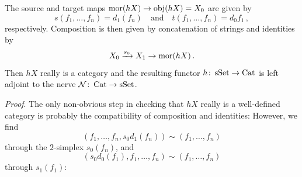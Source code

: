         The source and target maps $\operatorname{mor}(hX) \to \operatorname{obj}(hX) = X_0$ are given by
        \begin{equation*}
            s(f_1, \ldots, f_n) = d_1(f_n) \quad \text{and} \quad t(f_1, \ldots, f_n) = d_0 f_1 \,,
        \end{equation*}
        respectively. Composition is then given by concatenation of strings and identities by
        \begin{equation*}
            X_0 \xrightarrow{s_0} X_1 \rightarrow \operatorname{mor}(hX) \,.
        \end{equation*}
        Then $hX$ really is a category and the resulting functor $h \colon \operatorname{sSet} \to \operatorname{Cat}$ is left adjoint to the nerve $\mathcal{N} \colon \operatorname{Cat} \to \operatorname{sSet}$.
        \smallskip

        \emph{Proof}. The only non-obvious step in checking that $hX$ really is a well-defined category is probably the compatibility of composition and identities:
        However, we find
        \begin{equation*}
            (f_1, \ldots, f_n, s_0 d_1(f_n)) \sim (f_1, \ldots, f_n)
        \end{equation*}
        through the $2$-simplex $s_0(f_n)$, and
        \begin{equation*}
            (s_0d_0(f_1), f_1, \ldots, f_n) \sim (f_1, \ldots, f_n)
        \end{equation*}
        through $s_1(f_1)$:
